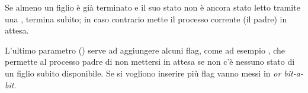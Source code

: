 Se almeno un figlio è già terminato e il suo stato non è ancora stato letto tramite una ,  termina subito; in caso contrario mette il processo corrente (il padre) in attesa.

L'ultimo parametro () serve ad aggiungere alcuni flag, come ad esempio , che permette al processo padre di non mettersi in attesa se non c'è nessuno stato di un figlio subito disponibile. Se si vogliono inserire più flag vanno messi in \emph{or bit-a-bit}.